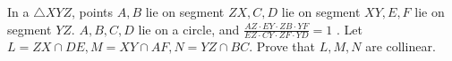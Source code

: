 In a $\triangle XYZ$, points $A,B$ lie on segment $ZX, C,D$ lie on segment $XY , E, F$ lie on segment $YZ$.
$A, B, C, D$ lie on a circle, and $\frac{AZ \cdot EY  \cdot  ZB  \cdot  Y F}{EZ  \cdot  CY  \cdot  ZF  \cdot Y D}= 1$ .
Let $L = ZX \cap DE,M = XY \cap AF,N = Y Z \cap BC$.
Prove that $L,M,N$ are collinear.